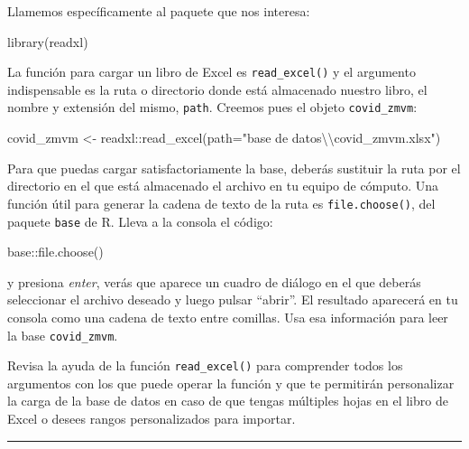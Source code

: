 \documentclass[
  11pt,
  oneside]{book}
\newenvironment{Shaded}{\begin{snugshade}}{\end{snugshade}}
\newcommand{\AttributeTok}[1]{\textcolor[rgb]{0.77,0.63,0.00}{#1}}
\newcommand{\FunctionTok}[1]{\textcolor[rgb]{0.00,0.00,0.00}{#1}}
\newcommand{\NormalTok}[1]{#1}
\newcommand{\OtherTok}[1]{\textcolor[rgb]{0.56,0.35,0.01}{#1}}
\newcommand{\SpecialCharTok}[1]{\textcolor[rgb]{0.00,0.00,0.00}{#1}}
\newcommand{\StringTok}[1]{\textcolor[rgb]{0.31,0.60,0.02}{#1}}
\begin{document}
Llamemos específicamente al paquete que nos interesa:

\begin{Shaded}
\begin{Highlighting}[]
\FunctionTok{library}\NormalTok{(readxl)}
\end{Highlighting}
\end{Shaded}

La función para cargar un libro de Excel es \texttt{read\_excel()} y el argumento indispensable es la ruta o directorio donde está almacenado nuestro libro, el nombre y extensión del mismo, \texttt{path}. Creemos pues el objeto \texttt{covid\_zmvm}:

\begin{Shaded}
\begin{Highlighting}[]
\NormalTok{covid\_zmvm }\OtherTok{\textless{}{-}}\NormalTok{ readxl}\SpecialCharTok{::}\FunctionTok{read\_excel}\NormalTok{(}\AttributeTok{path=}\StringTok{"base de datos}\SpecialCharTok{\textbackslash{}\textbackslash{}}\StringTok{covid\_zmvm.xlsx"}\NormalTok{)}
\end{Highlighting}
\end{Shaded}

Para que puedas cargar satisfactoriamente la base, deberás sustituir la ruta por el directorio en el que está almacenado el archivo en tu equipo de cómputo. Una función útil para generar la cadena de texto de la ruta es \texttt{file.choose()}, del paquete \texttt{base} de R. Lleva a la consola el código:

\begin{Shaded}
\begin{Highlighting}[]
\NormalTok{base}\SpecialCharTok{::}\FunctionTok{file.choose}\NormalTok{()}
\end{Highlighting}
\end{Shaded}

y presiona \emph{enter}, verás que aparece un cuadro de diálogo en el que deberás seleccionar el archivo deseado y luego pulsar ``abrir''. El resultado aparecerá en tu consola como una cadena de texto entre comillas. Usa esa información para leer la base \texttt{covid\_zmvm}.

Revisa la ayuda de la función \texttt{read\_excel()} para comprender todos los argumentos con los que puede operar la función y que te permitirán personalizar la carga de la base de datos en caso de que tengas múltiples hojas en el libro de Excel o desees rangos personalizados para importar.

\begin{center}\rule{0.5\linewidth}{0.5pt}\end{center}
\end{document}
